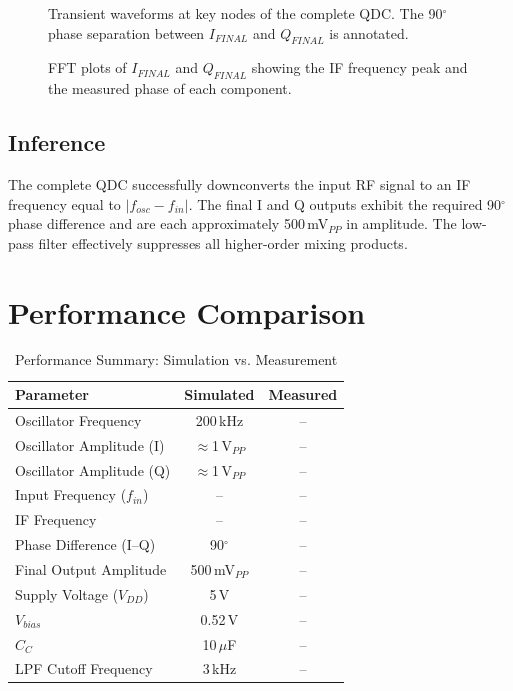 \documentclass[conference]{IEEEtran}
\begin{document}
\begin{figure}[H]
    \centering
    \caption{Transient waveforms at key nodes of the complete QDC. The 90$^\circ$ phase separation between $I_{FINAL}$ and $Q_{FINAL}$ is annotated.}
    \label{fig:full_transient}
\end{figure}

\begin{figure}[H]
    \centering
    \caption{FFT plots of $I_{FINAL}$ and $Q_{FINAL}$ showing the IF frequency peak and the measured phase of each component.}
    \label{fig:full_fft}
\end{figure}

\subsection{Inference}

The complete QDC successfully downconverts the input RF signal to an IF frequency equal to $|f_{osc} - f_{in}|$. The final I and Q outputs exhibit the required 90$^\circ$ phase difference and are each approximately 500\,mV$_{PP}$ in amplitude. The low-pass filter effectively suppresses all higher-order mixing products.

\section{Performance Comparison}

\begin{table}[H]
\centering
\caption{Performance Summary: Simulation vs. Measurement}
\begin{tabular}{lcc}
\toprule
\textbf{Parameter} & \textbf{Simulated} & \textbf{Measured} \\
\midrule
Oscillator Frequency & 200\,kHz & -- \\
Oscillator Amplitude (I) & $\approx$1\,V$_{PP}$ & -- \\
Oscillator Amplitude (Q) & $\approx$1\,V$_{PP}$ & -- \\
Input Frequency ($f_{in}$) & -- & -- \\
IF Frequency & -- & -- \\
Phase Difference (I--Q) & 90$^\circ$ & -- \\
Final Output Amplitude & 500\,mV$_{PP}$ & -- \\
Supply Voltage ($V_{DD}$) & 5\,V & -- \\
$V_{bias}$ & 0.52\,V & -- \\
$C_C$ & 10\,$\mu$F & -- \\
LPF Cutoff Frequency & 3\,kHz & -- \\
\bottomrule
\end{tabular}
\label{tab:comparison}
\end{table}
\end{document}
